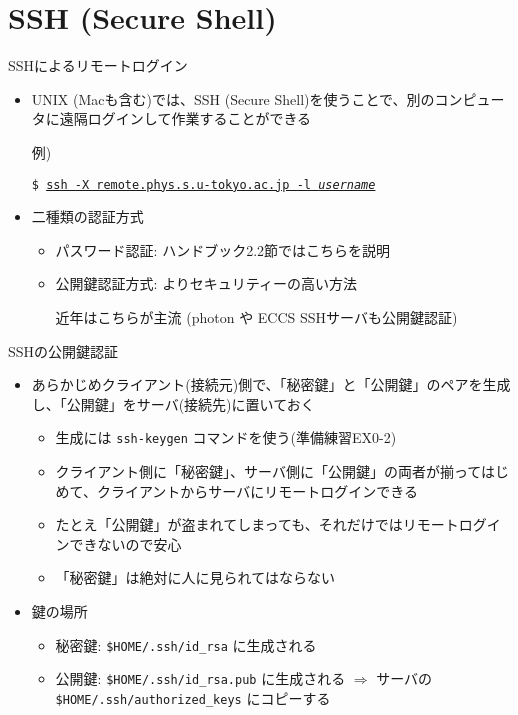 \section{SSH (Secure Shell)}

\begin{frame}[t,fragile]{SSHによるリモートログイン}
  \begin{itemize}
    \setlength{\itemsep}{1em}
  \item UNIX (Macも含む)では、SSH (Secure Shell)を使うことで、別のコンピュータに遠隔ログインして作業することができる

    例)
    
    {\tt \$ \underline{ssh -X remote.phys.s.u-tokyo.ac.jp -l {\it username}}}
  \item 二種類の認証方式
    \begin{itemize}
    \item パスワード認証: ハンドブック2.2節ではこちらを説明
    \item 公開鍵認証方式: よりセキュリティーの高い方法

      近年はこちらが主流 (photon や ECCS SSHサーバも公開鍵認証)
    \end{itemize}
  \end{itemize}
\end{frame}

\begin{frame}[t,fragile]{SSHの公開鍵認証}
  \begin{itemize}
    \setlength{\itemsep}{1em}
  \item あらかじめクライアント(接続元)側で、「秘密鍵」と「公開鍵」のペアを生成し、「公開鍵」をサーバ(接続先)に置いておく
    \begin{itemize}
    \item 生成には {\tt ssh-keygen} コマンドを使う(準備練習EX0-2)
    \item クライアント側に「秘密鍵」、サーバ側に「公開鍵」の両者が揃ってはじめて、クライアントからサーバにリモートログインできる
    \item たとえ「公開鍵」が盗まれてしまっても、それだけではリモートログインできないので安心
    \item 「秘密鍵」は絶対に人に見られてはならない
    \end{itemize}
  \item 鍵の場所
    \begin{itemize}
    \item 秘密鍵: {\tt \$HOME/.ssh/id\_rsa} に生成される
    \item 公開鍵: {\tt \$HOME/.ssh/id\_rsa.pub} に生成される $\Rightarrow$
      サーバの {\tt \$HOME/.ssh/authorized\_keys} にコピーする
    \end{itemize}
  \end{itemize}
\end{frame}
